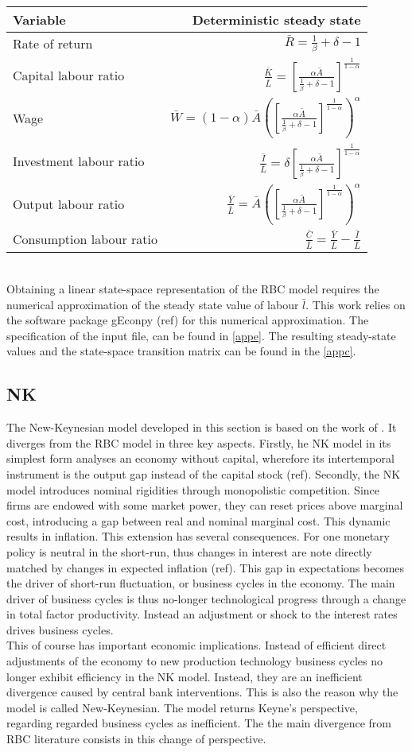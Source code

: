 \documentclass[12pt,a4paper,english]{article} %
\newcommand{\Rss}{\frac{1}{\beta} + \delta - 1}
\newcommand{\Ass}{\bar{A}}
\newcommand{\KLss}{\left[ \frac{\alpha \Ass}{\Rss} \right]^{\frac{1}{1-\alpha}}}
\begin{document}
	\begin{tabular}{lr}
		\textbf{Variable} & \textbf{Deterministic steady state}\\
		\hline 
		Rate of return & $\bar{R} = \Rss$ \\
		Capital labour ratio & $\frac{\bar{K}}{\bar{L}} = \KLss$ \\
		Wage & $\bar{W} = (1 - \alpha) \Ass \left(\KLss\right)^\alpha$ \\
		Investment labour ratio & $\frac{\bar{I}}{\bar{L}} = \delta \KLss$ \\
		Output labour ratio & $\frac{\bar{Y}}{\bar{L}} = \Ass \left(\KLss\right)^\alpha$ \\
		Consumption labour ratio & $\frac{\bar{C}}{\bar{L}} = \frac{\bar{Y}}{\bar{L}} - \frac{\bar{I}}{\bar{L}}$ \\
	\end{tabular}\\

	Obtaining a linear state-space representation of the RBC model requires the numerical approximation of the steady state value of labour $\bar{l}$. This work relies on the software package gEconpy (ref) for this numerical approximation. The specification of the input file, can be found in \ref{appe}. The resulting steady-state values and the state-space transition matrix can be found in the \ref{appc}. 

	\subsection{NK}
	The New-Keynesian model developed in this section is based on the work of \cite{gali_monetary_2008}. It diverges from the RBC model in three key aspects. Firstly, he NK model in its simplest form analyses an economy without capital, wherefore its intertemporal  instrument is the output gap instead of the capital stock (ref). Secondly, the NK model introduces nominal rigidities through monopolistic competition. Since firms are endowed with some market power, they can reset prices above marginal cost, introducing a gap between real and nominal marginal cost. This dynamic results in inflation. This extension has several consequences. For one monetary policy is neutral in the short-run, thus changes in interest are note directly matched by changes in expected inflation (ref). This gap in expectations becomes the driver of short-run fluctuation, or business cycles in the economy. The main driver of business cycles is thus no-longer technological progress through a change in total factor productivity. Instead an adjustment or shock to the interest rates drives business cycles. \\
	This of course has important economic implications. Instead of efficient direct adjustments of the economy to new production technology business cycles no longer exhibit efficiency in the NK model. Instead, they are an inefficient divergence caused by central bank interventions. This is also the reason why the model is called New-Keynesian. The model returns Keyne's perspective, regarding regarded business cycles as inefficient. The the main divergence from RBC literature consists in this change of perspective.
		
\end{document}
